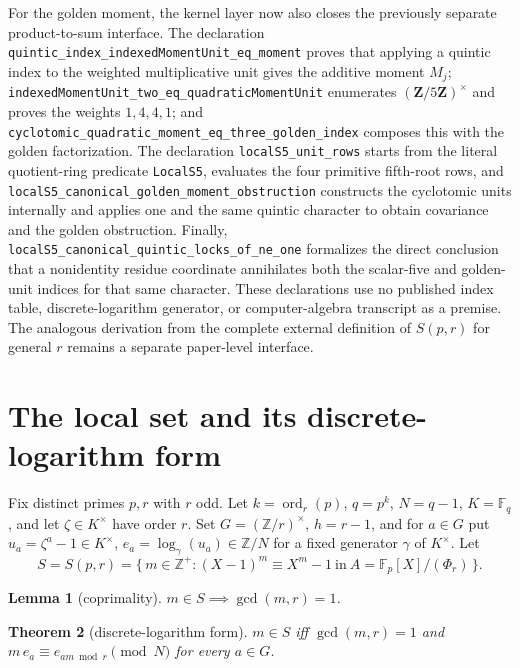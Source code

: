 \documentclass[11pt]{amsart}
\newtheorem{theorem}{Theorem}[section]
\newtheorem{lemma}[theorem]{Lemma}
\theoremstyle{definition}
\theoremstyle{remark}
\newcommand{\F}{\mathbb{F}}
\newcommand{\Z}{\mathbb{Z}}
\newcommand{\ord}{\operatorname{ord}}
\begin{document}
For the golden moment, the kernel layer now also closes the previously
separate product-to-sum interface.  The declaration
\texttt{quintic\_index\_indexedMomentUnit\_eq\_moment} proves that applying
a quintic index to the weighted multiplicative unit gives the additive
moment \(M_j\);
\texttt{indexedMomentUnit\_two\_eq\_quadraticMomentUnit} enumerates
\((\mathbf Z/5\mathbf Z)^\times\) and proves the weights \(1,4,4,1\);
and \texttt{cyclotomic\_quadratic\_moment\_eq\_three\_golden\_index}
composes this with the golden factorization.  The declaration
\texttt{localS5\_unit\_rows} starts from the literal quotient-ring predicate
\texttt{LocalS5}, evaluates the four primitive fifth-root rows, and
\texttt{localS5\_canonical\_golden\_moment\_obstruction} constructs the
cyclotomic units internally and applies one and the same quintic character
to obtain covariance and the golden obstruction.  Finally,
\texttt{localS5\_canonical\_quintic\_locks\_of\_ne\_one} formalizes the
direct conclusion that a nonidentity residue coordinate annihilates both
the scalar-five and golden-unit indices for that same character.  These
declarations use no published index table, discrete-logarithm generator, or
computer-algebra transcript as a premise.  The analogous derivation from the
complete external definition of \(S(p,r)\) for general \(r\) remains a
separate paper-level interface.

\section{The local set and its discrete-logarithm form}\label{sec:local}

Fix distinct primes $p, r$ with $r$ odd. Let $k = \ord_r(p)$, $q = p^k$,
$N = q - 1$, $K = \F_q$, and let $\zeta \in K^\times$ have order $r$. Set
$G = (\Z/r)^\times$, $h = r-1$, and for $a \in G$ put $u_a = \zeta^a - 1 \in
K^\times$, $e_a = \log_\gamma(u_a) \in \Z/N$ for a fixed generator $\gamma$
of $K^\times$. Let
\[
S = S(p,r) = \{\, m \in \Z^+ : (X-1)^m \equiv X^m - 1 \ \text{in}\
A = \F_p[X]/(\Phi_r) \,\}.
\]

\begin{lemma}[coprimality]\label{lem:coprime}
$m \in S \implies \gcd(m,r) = 1$.
\end{lemma}

\begin{theorem}[discrete-logarithm form]\label{thm:T5}
$m \in S$ iff $\gcd(m,r)=1$ and $m\, e_a \equiv e_{am \bmod r} \pmod N$
for every $a \in G$.
\end{theorem}
\end{document}
